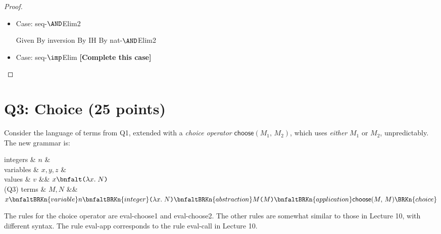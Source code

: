 {\begin{proof}
\begin{itemize}
  \item Case: seq-$\AND$Elim2

    \begin{llproof}
        {Given}
        {By inversion}
        {By IH}
        {By nat-$\AND$Elim2}
    \end{llproof}


  \item Case: seq-$\imp$Elim
    \textbf{[Complete this case]}

\vfill
  \end{itemize}
\end{proof}



}  %

\clearpage

\section{Q3: Choice (25 points)}
\newcommand{\DC}[2]{\textsf{choose}({#1},\,{#2})}

Consider the language of terms from Q1, extended with
a \emph{choice operator} $\DC{M_1}{M_2}$, which uses \emph{either} $M_1$ or $M_2$,
unpredictably.
The new grammar is:

\begin{grammar}
integers & $n$ &
\\
variables & $x, y, z$ &
 \\
values & $v$
   &\bnfas&
   $x \bnfalt \lcabs{x}{N}
   $
\\
(Q3) terms  & $M, N$ &\bnfas&
      $x
      \bnfaltBRKn{variable}
      n
      \bnfaltBRKn{integer}
      \lcabs{x}{N}
      \bnfaltBRKn{abstraction}
      M\texttt(M\texttt)
      \bnfaltBRKn{application}
      \DC{M}{M}
      \BRKn{choice}
      $
\end{grammar}


The rules for the choice operator are eval-choose1 and eval-choose2.
The other rules are somewhat similar to those in Lecture 10, with different syntax.
The rule eval-app corresponds to the rule eval-call in Lecture 10.

\medskip

\vspace*{-1.5ex}

